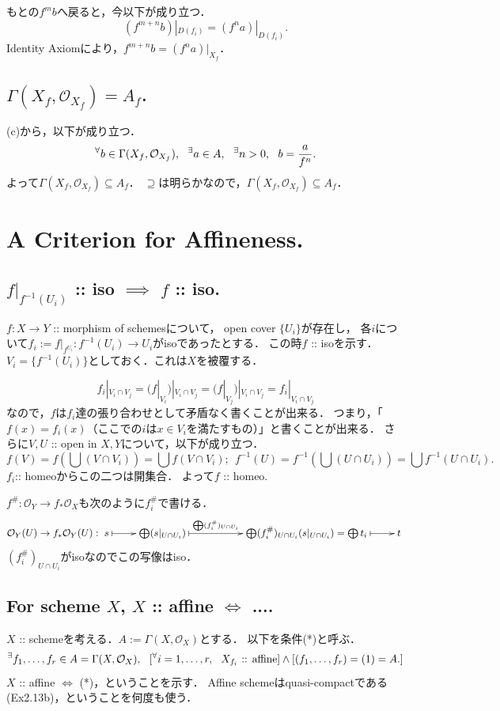 \documentclass[a4paper]{jsarticle}
\newcommand{\shO}{\mathcal{O}}
\begin{document}
    もとの$f^m b$へ戻ると，今以下が成り立つ．
    \[ (f^{m+n} b)|_{D(f_i)}=(f^n a)|_{D(f_i)}. \]
    Identity Axiomにより，$f^{m+n} b=(f^n a)|_{X_f}$．

    \subsection{$\Gamma(X_f, \shO_{X_f})=A_{f}$.}
    (c)から，以下が成り立つ．
    \[ \Forall{b \in \Gamma(X_f, \shO_{X_f})} \Exists{a \in A} \Exists{n>0} b=\frac{a}{f^n}. \]
    よって$\Gamma(X_f, \shO_{X_f}) \subseteq A_f$．
    $\supseteq$は明らかなので，$\Gamma(X_f, \shO_{X_f}) \subseteq A_f$．

\section{A Criterion for Affineness.} %
    \subsection{$f|_{f^{-1}(U_i)}$ :: iso $\implies$ $f$ :: iso.}
    $f: X \to Y$ :: morphism of schemesについて，
    open cover $\{U_i\}$が存在し，
    各$i$について$f_i:=f|_{f^{U_i}}: f^{-1}(U_i) \to U_i$がisoであったとする．
    この時$f$ :: isoを示す．
    $V_i=\{f^{-1}(U_i)\}$としておく．これは$X$を被覆する．

    \[ f_i|_{V_i \cap V_j}=(f|_{V_i})|_{V_i \cap V_j}=(f|_{V_j})|_{V_i \cap V_j}=f_i|_{V_i \cap V_j} \]
    なので，$f$は$f_i$達の張り合わせとして矛盾なく書くことが出来る．
    つまり，「$f(x)=f_i(x)$（ここでの$i$は$x \in V_i$を満たすもの）」と書くことが出来る．
    さらに$V,U$ :: open in $X, Y$について，以下が成り立つ．
    \[ f(V)=f(\bigcup (V \cap V_i))=\bigcup f(V \cap V_i);~~ f^{-1}(U)=f^{-1}(\bigcup (U \cap U_i))=\bigcup f^{-1}(U \cap U_i). \]
    $f_i$:: homeoからこの二つは開集合．
    よって$f$ :: homeo.

    $f^{\#}: \shO_{Y} \to f_* \shO_{X}$も次のように$f_i^{\#}$で書ける．
    \[
        \shO_{Y}(U) \to f_* \shO_{Y}(U):
        \xymatrix{
        s \ar@{|->}[r]
        & \bigoplus (s|_{U \cap U_i}) \ar@{|->}[rr]^-{\bigoplus (f_i^{\#})_{U \cap U_i}}
        & {}
        & \bigoplus (f_i^{\#})_{U \cap U_i}(s|_{U \cap U_i})=\bigoplus t_i \ar@{|->}[r]
        & t
        }
    \]
    $(f_i^{\#})_{U \cap U_i}$がisoなのでこの写像はiso．

    \subsection{For scheme $X$, $X$ :: affine $\iff$ ....}
    $X$ :: schemeを考える．$A:=\Gamma(X, \shO_X)$とする．
    以下を条件(*)と呼ぶ．
    \[ \Exists{f_1, \dots, f_r \in A=\Gamma(X, \shO_X)} [\Forall{i=1,\dots,r} X_{f_i} \text{ :: affine}] \land [(f_1,\dots,f_r)=(1)=A.] \]
    $X$ :: affine $\iff$ (*)，ということを示す．
    Affine schemeはquasi-compactである(Ex2.13b)，ということを何度も使う．
\end{document}
